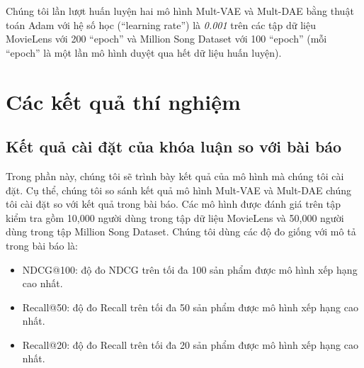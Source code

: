 Chúng tôi lần lượt huấn luyện hai mô hình Mult-VAE và Mult-DAE bằng thuật toán Adam \cite{Goodfellow-et-al-2016-Book} với hệ số học (``learning rate'') là \textit{0.001} trên các tập dữ liệu MovieLens \cite{Ml20M} với 200 ``epoch'' và Million Song Dataset \cite{MSD} với 100 ``epoch'' (mỗi ``epoch'' là một lần mô hình duyệt qua hết dữ liệu huấn luyện).


\section{Các kết quả thí nghiệm}
    \subsection{Kết quả cài đặt của khóa luận so với bài báo}
    \label{experiment1}
    Trong phần này, chúng tôi sẽ trình bày kết quả của mô hình mà chúng tôi cài đặt. 
    Cụ thể, chúng tôi so sánh kết quả mô hình Mult-VAE và Mult-DAE chúng tôi cài đặt so với kết quả trong bài báo.
    Các mô hình được đánh giá trên tập kiểm tra gồm 10,000 người dùng trong tập dữ liệu MovieLens và 50,000 người dùng trong tập Million Song Dataset.
    Chúng tôi dùng các độ đo giống với mô tả trong bài báo là:
    \begin{itemize}
        \item NDCG@100: độ đo NDCG trên tối đa 100 sản phẩm được mô hình xếp hạng cao nhất.
        \item Recall@50: độ đo Recall trên tối đa 50 sản phẩm được mô hình xếp hạng cao nhất.
        \item Recall@20: độ đo Recall trên tối đa 20 sản phẩm được mô hình xếp hạng cao nhất.
    \end{itemize}

